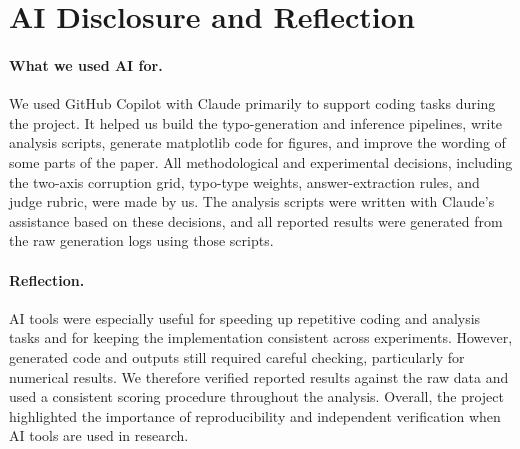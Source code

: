\documentclass[11pt]{article}
\begin{document}
\section{AI Disclosure and Reflection}
\paragraph{What we used AI for.} We used GitHub Copilot with Claude primarily to support coding tasks during the project. It helped us build the typo-generation and inference pipelines, write analysis scripts, generate matplotlib code for figures, and improve the wording of some parts of the paper. All methodological and experimental decisions, including the two-axis corruption grid, typo-type weights, answer-extraction rules, and judge rubric, were made by us. The analysis scripts were written with Claude's assistance based on these decisions, and all reported results were generated from the raw generation logs using those scripts.

\paragraph{Reflection.} AI tools were especially useful for speeding up repetitive coding and analysis tasks and for keeping the implementation consistent across experiments. However, generated code and outputs still required careful checking, particularly for numerical results. We therefore verified reported results against the raw data and used a consistent scoring procedure throughout the analysis. Overall, the project highlighted the importance of reproducibility and independent verification when AI tools are used in research.



\clearpage
\onecolumn
\appendix
\end{document}
